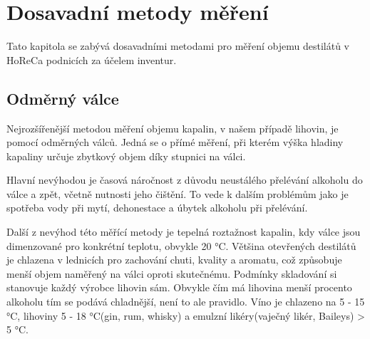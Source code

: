 \chapter{Dosavadní metody měření}
\label{Dosavadní metody měření}
Tato kapitola se zabývá dosavadními metodami pro měření objemu destilátů v HoReCa podnicích za účelem inventur.

\section{Odměrný válce}
\label{Dosavadní metody měření - valce}



Nejrozšířenější metodou měření objemu kapalin, v našem případě lihovin, je pomocí odměrných válců. Jedná se o přímé měření, při kterém výška hladiny kapaliny určuje zbytkový objem díky stupnici na válci.

Hlavní nevýhodou je časová náročnost z důvodu neustálého přelévání alkoholu do válce a zpět, včetně nutnosti 
jeho čištění. To vede k dalším problémům jako je spotřeba vody při mytí, dehonestace a úbytek alkoholu při přelévání.

Další z nevýhod této měřící metody je tepelná roztažnost kapalin, kdy válce jsou dimenzované pro 
konkrétní teplotu, obvykle 20 °C. Většina otevřených destilátů je chlazena v lednicích pro zachování chuti, kvality a aromatu, což způsobuje menší objem naměřený na válci oproti skutečnému. Podmínky skladování si stanovuje každý výrobce lihovin sám. Obvykle čím má lihovina menší procento alkoholu tím se podává chladnější, není to ale pravidlo. Víno je chlazeno na 5 - 15 °C, lihoviny 5 - 18 °C(gin, rum, whisky) a emulzní likéry(vaječný likér, Baileys) > 5 °C. 
	
